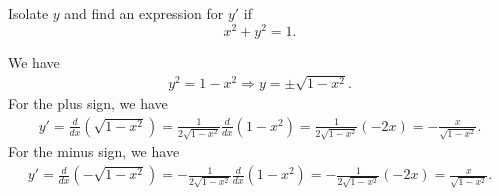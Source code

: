 \documentclass[addpoints, 12pt]{exam}%
\newcommand{\op}{\left(}
\newcommand{\fp}{\right)}
\newcommand{\Ra}{\Rightarrow}
\theoremstyle{definition}
\begin{document}
\begin{questions}
Isolate $y$ and find an expression for $y'$ if
	$$
	x^2 + y^2 = 1 .
	$$
	\begin{solution}
	{\color{red}
	We have
		\begin{align*}
		y^2 = 1 - x^2 \Ra y = \pm \sqrt{1 - x^2} .
		\end{align*}
	For the plus sign, we have
		\begin{align*}
		y' = \frac{d}{dx} \op \sqrt{1 - x^2} \fp = \frac{1}{2 \sqrt{1 - x^2}} \frac{d}{dx} \op 1 - x^2 \fp = \frac{1}{2 \sqrt{1 - x^2}} \op -2x \fp = - \frac{x}{\sqrt{1 - x^2}} .
		\end{align*}
	For the minus sign, we have
		\begin{align*}
		y' = \frac{d}{dx} \op - \sqrt{1 - x^2} \fp = - \frac{1}{2 \sqrt{1 - x^2}} \frac{d}{dx} \op 1 - x^2 \fp = - \frac{1}{2 \sqrt{1 - x^2}} (-2x) = \frac{x}{\sqrt{1 -x^2}} .
		\end{align*}
	}
	\end{solution}

\newpage

\phantom{2}

\end{questions}
\end{document}
